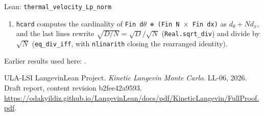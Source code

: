 \documentclass[11pt,a4paper]{article}
\begin{document}
\begin{leanbox}{Lean: \texttt{thermal\_\allowbreak{}velocity\_\allowbreak{}Lp\_\allowbreak{}norm}}
\begin{enumerate}
\item \texttt{hcard} computes the cardinality of \texttt{Fin d\ensuremath{\theta} ⊕ (Fin N \ensuremath{\times} Fin dx)} as \(d_\theta+Nd_x\), and the last lines rewrite \(\sqrt{D/N}=\sqrt D/\sqrt N\) (\texttt{Real.\allowbreak{}sqrt\_\allowbreak{}div}) and divide by \(\sqrt N\) (\texttt{eq\_\allowbreak{}div\_\allowbreak{}iff}, with \texttt{nlinarith} closing the rearranged identity).

\end{enumerate}
\end{leanbox}


Earlier results used here: \cite[Section~3.40.1]{LangevinLean2026Kinetic}.

\begin{thebibliography}{ULA-LSI}
LangevinLean Project. \emph{Kinetic Langevin Monte Carlo}. LL-06, 2026. Draft report, content revision b2fee42a9593. \url{https://odakyildiz.github.io/LangevinLean/docs/pdf/KineticLangevin/FullProof.pdf}.
\end{thebibliography}
\end{document}
